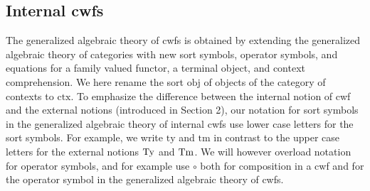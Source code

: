 \documentclass{mscs}
\newcommand{\FYI}[1]{{#1}}
\def\Obj{\mathrm{obj}}
\def\Hom{\mathrm{hom}}
\def\id{\mathrm{id}}
\newcommand{\ctx}{\mathrm{ctx}}
\newcommand{\ty}{\mathrm{ty}}
\newcommand{\tm}{\mathrm{tm}}
\begin{document}

\subsection{Internal cwfs}\label{gat-cwf}

The generalized algebraic theory of cwfs is obtained by extending the generalized algebraic theory of categories with new sort symbols, operator symbols, and equations for a family valued functor, a terminal object, and context comprehension. We here rename the sort $\Obj$ of objects of the category of contexts to $\ctx$. To emphasize the difference between the internal notion of cwf and the external notions (introduced in Section 2), our notation for sort symbols in the generalized algebraic theory of internal cwfs use lower case letters for the sort symbols. For example, we write  $\ty$ and $\tm$ in contrast to the upper case letters for the external notions $\mathrm{Ty}$ and $\mathrm{Tm}$. We will however overload notation for operator symbols, and for example use $\circ$ both for composition in a cwf and for the operator symbol in the generalized algebraic theory of cwfs.
\end{document}
